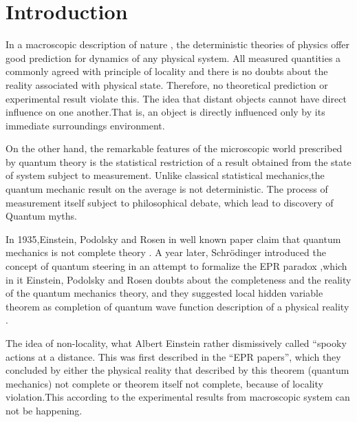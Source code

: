 \chapter{Introduction}


In a macroscopic description of nature
, the deterministic theories of physics offer good prediction for dynamics of any physical system. All measured quantities a commonly agreed with principle of locality and there is no doubts about the reality associated with physical state. Therefore, no theoretical prediction or experimental result violate this. The idea that distant objects cannot have direct influence on one another.That is, an object is directly influenced only by its immediate surroundings environment.

On the other hand, the remarkable features of the microscopic world prescribed by quantum theory is the statistical restriction of a result obtained from the state of system subject to measurement. Unlike classical statistical mechanics,the quantum mechanic result on the average is not deterministic.
The process of measurement itself subject to philosophical debate, which lead to discovery of Quantum myths.

In 1935,Einstein, Podolsky and Rosen in well known paper claim that quantum  mechanics is not complete theory \citep*{EPR}.
A year later, Schrödinger introduced the concept of quantum steering in an attempt to formalize the EPR paradox \citep*{schrodinger1935discussion},which in it Einstein, Podolsky and Rosen doubts about the completeness and the reality of the quantum mechanics theory, and they suggested local hidden variable theorem as completion of quantum wave function description of a physical reality \citep*{EPR}.
 
The idea of non-locality, what Albert Einstein rather dismissively called “spooky actions at a distance.
This was first described in the “EPR papers”\citep*{EPR}, which they concluded by either the physical reality that described by this theorem (quantum mechanics) not complete or theorem itself not complete, because of locality violation.This according to the experimental results from  macroscopic system can not be happening. 

